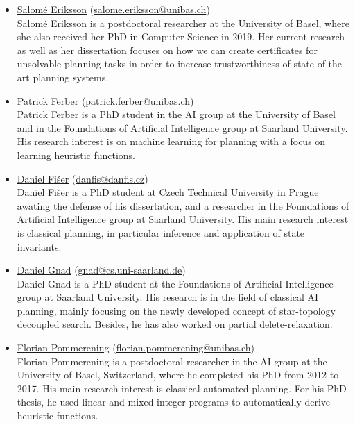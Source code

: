 \documentclass[10pt]{article}
\begin{document}
\begin{itemize}

\item \href{https://ai.dmi.unibas.ch/people/eriksson/}{Salom\'{e} Eriksson}
(\href{mailto:salome.eriksson@unibas.ch}{salome.eriksson@unibas.ch})\\
Salom\'{e} Eriksson is a postdoctoral researcher at the University of 
Basel, where she also received her PhD in Computer Science in 2019. Her
current research as well as her dissertation focuses on how we can
create certificates for unsolvable planning tasks in order to increase
trustworthiness of state-of-the-art planning systems.

\item \href{https://ai.dmi.unibas.ch/people/ferber/}{Patrick Ferber}
(\href{mailto:patrick.ferber@unibas.ch}{patrick.ferber@unibas.ch})\\
Patrick Ferber is a PhD student in the AI group at the University of 
Basel and in the Foundations of Artificial Intelligence group at 
Saarland University. His research interest is on machine learning for 
planning with a focus on learning heuristic functions.

\item \href{http://cs.fel.cvut.cz/en/people/fiserdan}{Daniel Fi\v{s}er}
(\href{mailto:danfis@danfis.cz}{danfis@danfis.cz})\\
Daniel Fi\v{s}er is a PhD student at Czech Technical University in Prague
awating the defense of his dissertation, and a researcher in the
Foundations of Artificial Intelligence group at Saarland University.
His main research interest is classical planning, in particular inference and
application of state invariants.

\item \href{http://fai.cs.uni-saarland.de/gnad/}{Daniel Gnad}
(\href{mailto:gnad@cs.uni-saarland.de}{gnad@cs.uni-saarland.de})\\
Daniel Gnad is a PhD student at the Foundations of Artificial
Intelligence group at Saarland University. His research is in the field
of classical AI planning, mainly focusing on the newly developed concept
of star-topology decoupled search. Besides, he has also worked on partial
delete-relaxation.

\item \href{http://ai.cs.unibas.ch/people/pommeren}{Florian Pommerening}
   (\href{mailto:florian.pommerening@unibas.ch}{florian.pommerening@unibas.ch})\\
Florian Pommerening is a postdoctoral researcher in the AI group at the
University of Basel, Switzerland, where he completed his PhD from 2012
to 2017. His main research interest is classical automated planning. For
his PhD thesis, he used linear and mixed integer programs to
automatically derive heuristic functions.


\end{itemize}
\end{document}

